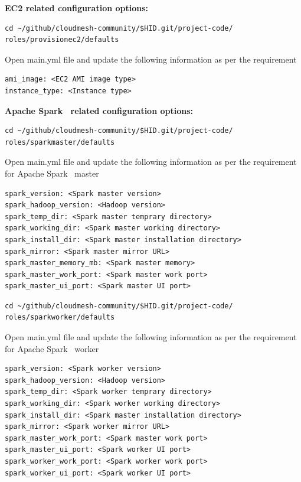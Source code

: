 \textbf{EC2 related configuration options:}

\begin{verbatim}
cd ~/github/cloudmesh-community/$HID.git/project-code/
roles/provisionec2/defaults
\end{verbatim}

Open main.yml file and update the following information as per the
requirement

\begin{verbatim}
ami_image: <EC2 AMI image type>
instance_type: <Instance type>
\end{verbatim}

\textbf{Apache Spark~\cite{hid-sp18-511-www-spark} related configuration options:}

\begin{verbatim}
cd ~/github/cloudmesh-community/$HID.git/project-code/
roles/sparkmaster/defaults
\end{verbatim}

Open main.yml file and update the following information as per the
requirement for Apache Spark~\cite{hid-sp18-511-www-spark} master

\begin{verbatim}
spark_version: <Spark master version>
spark_hadoop_version: <Hadoop version>
spark_temp_dir: <Spark master temprary directory>
spark_working_dir: <Spark master working directory>
spark_install_dir: <Spark master installation directory>
spark_mirror: <Spark master mirror URL>
spark_master_memory_mb: <Spark master memory>
spark_master_work_port: <Spark master work port>
spark_master_ui_port: <Spark master UI port>
\end{verbatim}

\begin{verbatim}
cd ~/github/cloudmesh-community/$HID.git/project-code/
roles/sparkworker/defaults
\end{verbatim}

Open main.yml file and update the following information as per the
requirement for Apache Spark~\cite{hid-sp18-511-www-spark} worker

\begin{verbatim}
spark_version: <Spark worker version>
spark_hadoop_version: <Hadoop version>
spark_temp_dir: <Spark worker temprary directory>
spark_working_dir: <Spark worker working directory>
spark_install_dir: <Spark master installation directory>
spark_mirror: <Spark worker mirror URL>
spark_master_work_port: <Spark master work port>
spark_master_ui_port: <Spark worker UI port>
spark_worker_work_port: <Spark worker work port>
spark_worker_ui_port: <Spark worker UI port>
\end{verbatim}

